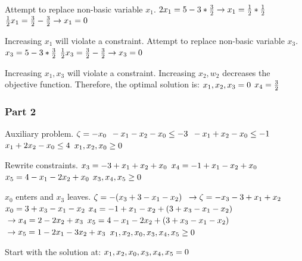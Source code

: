 \documentclass[17pt]{extarticle}
\begin{document}
\bigskip Attempt to replace non-basic variable $x_1$.
$\\ 2x_1 = 5 - 3 * \frac{3}{2} \to x_1 = \frac{1}{2} * \frac{1}{2}$
$\\ \frac{1}{2}x_1 = \frac{3}{2} - \frac{3}{2} \to x_1 = 0$

\bigskip Increasing $x_1$ will violate a constraint. Attempt to replace non-basic variable $x_3$.
$\\ x_3 = 5 - 3 * \frac{3}{2}$
$\\ \frac{1}{2}x_3 = \frac{3}{2} - \frac{3}{2} \to x_3 = 0$

\bigskip Increasing $x_1, x_3$ will violate a constraint. Increasing $x_2, w_2$ decreases the objective function. Therefore, the optimal solution is:
$\\x_1, x_2, x_3 = 0$
$\\x_4 = \frac{3}{2}$

\subsubsection*{Part 2}
Auxiliary problem.
$\\\zeta = -x_0$
$\\ -x_1 - x_2 - x_0 \leq -3$
$\\ -x_1 + x_2 - x_0 \leq -1$
$\\ x_1 + 2x_2 - x_0 \leq 4$
$\\ x_1, x_2, x_0 \geq 0$

Rewrite constraints.
$\\ x_3 = - 3 + x_1 + x_2 + x_0$
$\\ x_4 = - 1 + x_1 - x_2 + x_0$
$\\ x_5 = 4 - x_1 - 2x_2 + x_0$
$\\ x_3, x_4, x_5 \geq 0$

$x_0$ enters and $x_3$ leaves.
$\\\zeta = -(x_3 + 3 - x_1 - x_2)$
$\\\to \zeta = -x_3 - 3 + x_1 + x_2$
$\\ x_0 = 3 + x_3 - x_1 - x_2$
$\\ x_4 = - 1 + x_1 - x_2 + (3 + x_3 - x_1 - x_2)$
$\\\to x_4 = 2 - 2x_2 + x_3$
$\\ x_5 = 4 - x_1 - 2x_2 + (3 + x_3 - x_1 - x_2)$
$\\\to x_5 = 1 - 2x_1 - 3x_2 + x_3$
$\\ x_1, x_2, x_0, x_3, x_4, x_5 \geq 0$

Start with the solution at:
$\\x_1, x_2, x_0, x_3, x_4, x_5 = 0$
\end{document}
